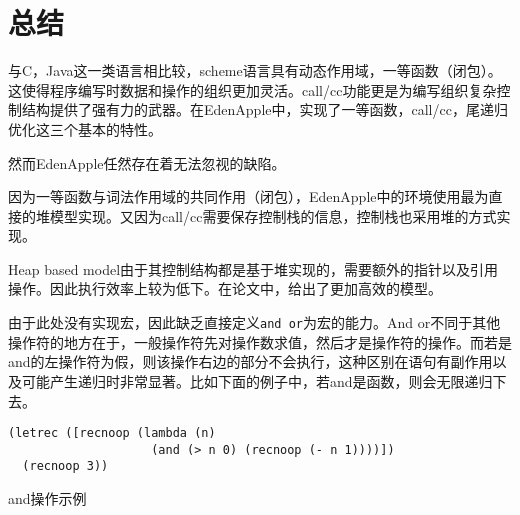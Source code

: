 \chapter{总结}

与C，Java这一类语言相比较，scheme语言具有动态作用域，一等函数（闭包）。这使得程序编写时数据和操作的组织更加灵活。call/cc功能更是为编写组织复杂控制结构提供了强有力的武器。在EdenApple中，实现了一等函数，call/cc，尾递归优化这三个基本的特性。

然而EdenApple任然存在着无法忽视的缺陷。

因为一等函数与词法作用域的共同作用（闭包），EdenApple中的环境使用最为直接的堆模型实现。又因为call/cc需要保存控制栈的信息，控制栈也采用堆的方式实现。

Heap based model由于其控制结构都是基于堆实现的，需要额外的指针以及引用操作。因此执行效率上较为低下。在论文\cite{dybvig87timpl}中，给出了更加高效的模型。

由于此处没有实现宏，因此缺乏直接定义\texttt{and or}为宏的能力。And or不同于其他操作符的地方在于，一般操作符先对操作数求值，然后才是操作符的操作。而若是and的左操作符为假，则该操作右边的部分不会执行，这种区别在语句有副作用以及可能产生递归时非常显著。比如下面的例子中，若and是函数，则会无限递归下去。

\begin{code}
\begin{verbatim}
(letrec ([recnoop (lambda (n)
                    (and (> n 0) (recnoop (- n 1))))])
  (recnoop 3))
\end{verbatim}
\caption{and操作示例}
\end{code}